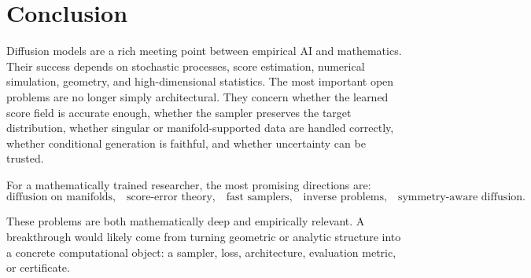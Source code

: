 \documentclass[11pt]{article}
\begin{document}
\section{Conclusion}

Diffusion models are a rich meeting point between empirical AI and mathematics. Their success depends on stochastic processes, score estimation, numerical simulation, geometry, and high-dimensional statistics. The most important open problems are no longer simply architectural. They concern whether the learned score field is accurate enough, whether the sampler preserves the target distribution, whether singular or manifold-supported data are handled correctly, whether conditional generation is faithful, and whether uncertainty can be trusted.

For a mathematically trained researcher, the most promising directions are:
\begin{equation}
\boxed{
\text{diffusion on manifolds,}
\quad
\text{score-error theory,}
\quad
\text{fast samplers,}
\quad
\text{inverse problems,}
\quad
\text{symmetry-aware diffusion.}
}
\end{equation}

These problems are both mathematically deep and empirically relevant. A breakthrough would likely come from turning geometric or analytic structure into a concrete computational object: a sampler, loss, architecture, evaluation metric, or certificate.
\end{document}
